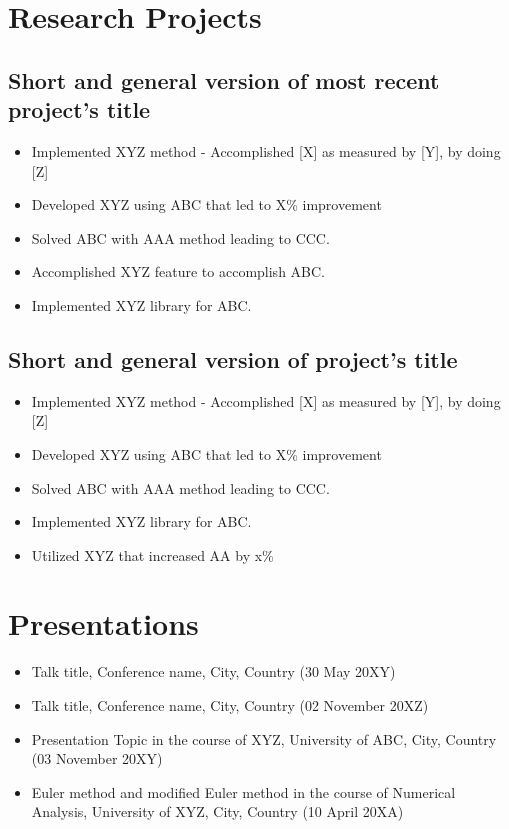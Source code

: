 \documentclass[11pt]{article}
\begin{document}
      \section{Research Projects}
      \subsection{Short and general version of most recent project's title} %
    \begin{itemize}
        \item[\checkmark] Implemented XYZ method - Accomplished [X] as measured by [Y], by doing [Z] 
        \item[\checkmark] Developed XYZ using ABC that led to X\% improvement 
        \item[\checkmark] Solved ABC with AAA method leading to CCC.
        \item[\checkmark] Accomplished XYZ feature to accomplish ABC.
        \item[\checkmark] Implemented XYZ library for ABC.
    \end{itemize}
       \subsection{Short and general version of project's title} %
    \begin{itemize}
        \item[\checkmark] Implemented XYZ method - Accomplished [X] as measured by [Y], by doing [Z] 
        \item[\checkmark] Developed XYZ using ABC that led to X\% improvement 
        \item[\checkmark] Solved ABC with AAA method leading to CCC.
        \item[\checkmark] Implemented XYZ library for ABC.
        \item[\checkmark] Utilized XYZ that increased AA by x\%
    \end{itemize}

    \section{Presentations}

    \begin{itemize}
        \item[\checkmark] Talk title, Conference name, City, Country (30 May 20XY)
        \item[\checkmark] Talk title, Conference name, City, Country (02 November 20XZ)
        \item[\checkmark] Presentation Topic in the course of XYZ, University of ABC, City, Country (03 November 20XY)
        \item[\checkmark] Euler method and modified Euler method in the course of Numerical Analysis, University of XYZ, City, Country (10 April 20XA)
    \end{itemize}
\end{document}
